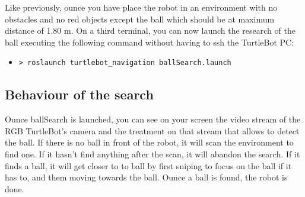 \documentclass[10pt,a4paper]{article}
\begin{document}
Like previously, ounce you have place the robot in an environment with no obstacles and no red objects except the ball which should be at maximum distance of 1.80 m. On a third terminal, you can now launch the research of the ball executing the following command without having to ssh the TurtleBot PC:

\begin{itemize}
\item[]  \begin{verbatim}> roslaunch turtlebot_navigation ballSearch.launch \end{verbatim}
\end{itemize}

\subsection{Behaviour of the search}

Ounce ballSearch is launched, you can see on your screen the video stream of the RGB TurtleBot's camera and the treatment on that stream that allows to detect the ball. If there is no ball in front of the robot, it will scan the environment to find one. If it hasn't find anything after the scan, it will abandon the search. If it finds a ball, it will get closer to to ball by first sniping to focus on the ball if it has to, and them moving towards the ball. Ounce a ball is found, the robot is done.
\end{document}

